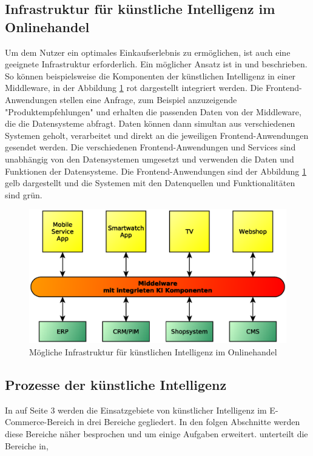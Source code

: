 \subsection{Infrastruktur für künstliche Intelligenz im Onlinehandel}
Um dem Nutzer ein optimales Einkaufserlebnis zu ermöglichen, ist auch eine geeignete Infrastruktur erforderlich. Ein möglicher Ansatz ist in \cite{netz98_headless_commerce} und \cite{perske_headless_commerce} beschrieben. So können beispielsweise die Komponenten der künstlichen Intelligenz in einer Middleware, in der Abbildung \ref{img:infrastructor_for_ai_in_e__commerce} rot dargestellt integriert werden. Die Frontend-Anwendungen stellen eine Anfrage, zum Beispiel anzuzeigende "Produktempfehlungen" und erhalten die passenden Daten von der Middleware, die die Datensysteme abfragt. Daten können dann simultan aus verschiedenen Systemen geholt, verarbeitet und direkt an die jeweiligen Frontend-Anwendungen gesendet werden. Die verschiedenen Frontend-Anwendungen und Services sind unabhängig von den Datensystemen umgesetzt und verwenden die Daten und Funktionen der Datensysteme. Die Frontend-Anwendungen sind der Abbildung \ref{img:infrastructor_for_ai_in_e__commerce} gelb dargestellt und die Systemen mit den Datenquellen und Funktionalitäten sind grün.

\begin{figure}[!ht]
	\centering
	\includegraphics[width=\linewidth]{images/ecommerce-eco-system.eps}
	\caption{Mögliche Infrastruktur für künstlichen Intelligenz im Onlinehandel}
	\label{img:infrastructor_for_ai_in_e__commerce}
\end{figure}

\subsection{Prozesse der künstliche Intelligenz}
In \cite{glaess2018kuenstliche} auf Seite 3 werden die Einsatzgebiete von künstlicher Intelligenz im E-Commerce-Bereich in drei Bereiche gegliedert. In den folgen Abschnitte werden diese Bereiche näher besprochen und um einige Aufgaben erweitert. \cite{glaess2018kuenstliche} unterteilt die Bereiche in,

